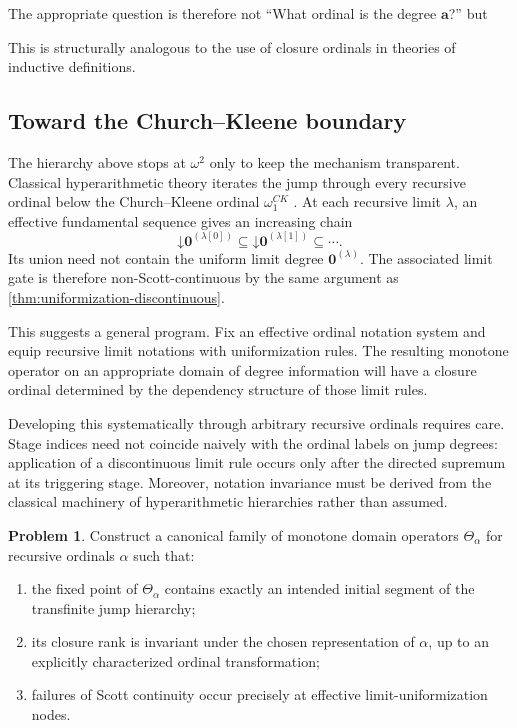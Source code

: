 \documentclass[11pt]{article}
\theoremstyle{definition}
\newtheorem{problem}[theorem]{Problem}
\theoremstyle{remark}
\newcommand{\down}{\mathord{\downarrow}}
\begin{document}
The appropriate question is therefore not ``What ordinal is the degree $\mathbf a$?'' but
\begin{center}
\end{center}
This is structurally analogous to the use of closure ordinals in theories of inductive definitions.

\subsection{Toward the Church--Kleene boundary}

The hierarchy above stops at $\omega^2$ only to keep the mechanism transparent. Classical hyperarithmetic theory iterates the jump through every recursive ordinal below the Church--Kleene ordinal $\omega_1^{CK}$ \cite{Spector1955,Slaman2005}. At each recursive limit $\lambda$, an effective fundamental sequence gives an increasing chain
\[
\down\mathbf0^{(\lambda[0])}
\subseteq
\down\mathbf0^{(\lambda[1])}
\subseteq\cdots.
\]
Its union need not contain the uniform limit degree $\mathbf0^{(\lambda)}$. The associated limit gate is therefore non-Scott-continuous by the same argument as \cref{thm:uniformization-discontinuous}.

This suggests a general program. Fix an effective ordinal notation system and equip recursive limit notations with uniformization rules. The resulting monotone operator on an appropriate domain of degree information will have a closure ordinal determined by the dependency structure of those limit rules.

Developing this systematically through arbitrary recursive ordinals requires care. Stage indices need not coincide naively with the ordinal labels on jump degrees: application of a discontinuous limit rule occurs only after the directed supremum at its triggering stage. Moreover, notation invariance must be derived from the classical machinery of hyperarithmetic hierarchies rather than assumed.

\begin{problem}
\label{prob:recursive-alpha}
Construct a canonical family of monotone domain operators $\Theta_\alpha$ for recursive ordinals $\alpha$ such that:
\begin{enumerate}
\item the fixed point of $\Theta_\alpha$ contains exactly an intended initial segment of the transfinite jump hierarchy;
\item its closure rank is invariant under the chosen representation of $\alpha$, up to an explicitly characterized ordinal transformation;
\item failures of Scott continuity occur precisely at effective limit-uniformization nodes.
\end{enumerate}
\end{problem}
\end{document}
